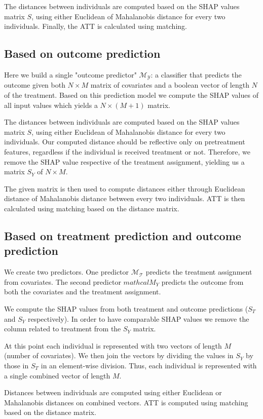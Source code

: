 \documentclass{article}
\begin{document}
The distances between individuals are computed based on the SHAP values matrix $S$, using either Euclidean of Mahalanobis distance for every two individuals. 
Finally, the ATT is calculated using matching. 

\subsection{Based on outcome prediction}
Here we build a single "outcome predictor" $\mathcal{M_Y}$: a classifier that predicts the outcome given both $N\times{}M$ matrix of covariates and a boolean vector of length $N$ of the treatment. 
Based on this prediction model we compute the SHAP values of all input values which yields a $N\times{}(M+1)$ matrix. 

The distances between individuals are computed based on the SHAP values matrix $S$, using either Euclidean of Mahalanobis distance for every two individuals. 
Our computed distance should be reflective only on pretreatment features, regardless if the individual is received treatment or not. Therefore, we remove the SHAP value respective of the treatment assignment, yielding us a matrix $S_Y$ of $N\times{}M$. 

The given matrix is then used to compute distances either through Euclidean distance of Mahalanobis distance between every two individuals. 
ATT is then calculated using matching based on the distance matrix. 

\subsection{Based on treatment prediction and outcome prediction}
We create two predictors. 
One predictor $\mathcal{M_T}$ predicts the treatment assignment from covariates.
The second predictor $mathcal{M}_Y$ predicts the outcome from both the covariates and the treatment assignment. 

We compute the SHAP values from both treatment and outcome predictions ($S_T$ and $S_Y$ respectively). In order to have comparable SHAP values we remove the column related to treatment from the $S_Y$ matrix. 

At this point each individual is represented with two vectors of length $M$ (number of covariates). We then join the vectors by dividing the values in $S_Y$ by those in $S_T$ in an element-wise division. Thus, each individual is represented with a single combined vector of length $M$.

Distances between individuals are computed using either Euclidean or Mahalanobis distances on combined vectors. ATT is computed using matching based on the distance matrix.
\end{document}
